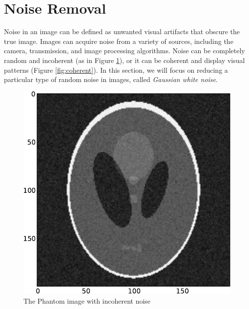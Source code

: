 \section*{Noise Removal}
Noise in an image can be defined as unwanted visual artifacts that
obscure the true image. Images can acquire noise from a variety of
sources, including the camera, transmission, and image processing
algorithms. Noise can be completely random and incoherent (as in
Figure \ref{fig:incoherent}), or it can be coherent and display
visual patterns (Figure \ref{fig:coherent}). In this section, we will
focus on reducing a particular type of random noise in images, called
\textit{Gaussian white noise}.

\begin{figure}[t]
    \includegraphics[width=\linewidth]{phantom_random.pdf}
    \caption{The Phantom image with incoherent noise}
    \label{fig:incoherent}
\endminipage\hfill
{}

\end{figure}
